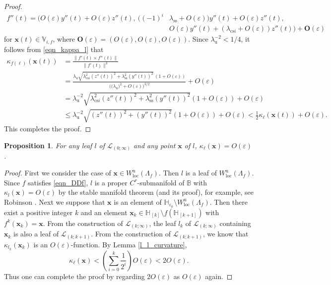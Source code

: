 \documentclass{amsart}
\newtheorem{prop}[thm]{Proposition}
\theoremstyle{definition}
\numberwithin{equation}{section}
\numberwithin{figure}{section}
\begin{document}
\begin{proof}
\begin{align*}
f''(t)=\bigl(O(\varepsilon)y''(t)+O(\varepsilon)z''(t),\ ((-1)^i&\lambda_{\mathrm{ss}}+O(\varepsilon))y''(t)+O(\varepsilon)z''(t),\\
&O(\varepsilon)y''(t)+(\lambda_{\mathrm{cs} i}+O(\varepsilon))z''(t)\bigr)+\boldsymbol{O}(\varepsilon)
\end{align*}
for $\boldsymbol{x}(t)\in \mathbb{V}_{i,f}$, 
where $\boldsymbol{O}(\varepsilon)=(O(\varepsilon),O(\varepsilon),O(\varepsilon))$.
Since $\lambda_{\mathrm{u}}^{-2}<1/4$, it follows from \eqref{eqn_kappa_l} that 
\begin{align*}
\kappa_{f(\ell)}(\boldsymbol{x}(t))&=
\frac{\|f'(t)\times f''(t)\|}{\|f'(t)\|^3}\\
&=\frac{\lambda_{\mathrm{u}}\sqrt{\lambda_{\mathrm{cs} i}^2(z''(t))^2+\lambda_{\mathrm{ss}}^2(y''(t))^2}\,(1+O(\varepsilon))}{\bigl((\lambda_{\mathrm{u}}\bigr)^2+O(\varepsilon)\bigr)^{3/2}}+O(\varepsilon)\\
&=\lambda_{\mathrm{u}}^{-2}\sqrt{\lambda_{\mathrm{cs} i}^2(z''(t))^2+\lambda_{\mathrm{ss}}^2(y''(t))^2}(1+O(\varepsilon))+O(\varepsilon)\\
&\leq \lambda_{\mathrm{u}}^{-2}\sqrt{(z''(t))^2+(y''(t))^2}(1+O(\varepsilon))+O(\varepsilon)< \frac12\kappa_\ell(\boldsymbol{x}(t))+O(\varepsilon).
\end{align*}
This completes the proof.
\end{proof}









\begin{prop}\label{p_curvature_curve}
For any leaf $l$ of $\mathcal{L}_{(0;\infty)}$ 
and any point $\boldsymbol{x}$ of $l$, 
$\kappa_\ell(\boldsymbol{x})=O(\varepsilon)$.
\end{prop}
\begin{proof}
First we consider the case of $\boldsymbol{x}\in W_{\mathrm{loc}}^{\mathrm{u}}(\Lambda_f)$.
Then $l$ is a leaf of $W_{\mathrm{loc}}^{\mathrm{u}}(\Lambda_f)$.
Since $f$ satisfies \eqref{eqn_DDf}, $l$ is a proper $C^r$-submanifold of $\mathbb{B}$ 
with $\kappa_l(\boldsymbol{x})=O(\varepsilon)$ by the stable manifold theorem (and its proof), 
for example, see Robinson \cite[Chapter 10, Theorem 2.1]{Ro99}.  
Next we suppose that $\boldsymbol{x}$ is an element of $\mathbb{H}_{\varepsilon_0}
\setminus W_{\mathrm{loc}}^{\mathrm{u}}(\Lambda_f)$.
Then there exist a positive integer $k$ and an element $\boldsymbol{x}_k\in \mathbb{H}_{\,[k]}\setminus 
f(\mathbb{H}_{\,[k+1]})$ with $f^k(\boldsymbol{x}_k)=\boldsymbol{x}$.
From the construction of $\mathcal{L}_{(k;\infty)}$, 
the leaf $l_k$ of $\mathcal{L}_{(k;\infty)}$ containing $\boldsymbol{x}_k$ is also a leaf of $\mathcal{L}_{(k;k+1)}$.
From the construction of $\mathcal{L}_{(k;k+1)}$, 
we know that  
$\kappa_{l_k}(\boldsymbol{x}_k)$ is an $O(\varepsilon)$-function.
By Lemma \ref{l_l_curvature}, 
$$\kappa_\ell(\boldsymbol{x})<\left(\sum_{i=0}^{k}\frac1{2^i}\right)O(\varepsilon)<2O(\varepsilon).$$
Thus one can complete the proof by regarding $2O(\varepsilon)$ as $O(\varepsilon)$ again.
\end{proof}
\end{document}
